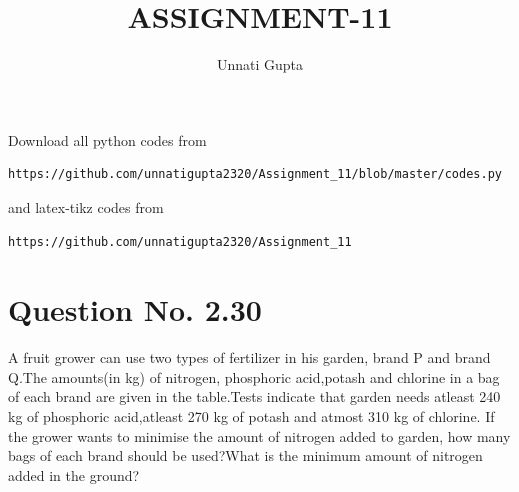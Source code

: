 \documentclass[journal,12pt,twocolumn]{IEEEtran}
\begin{document}
     \def\centbox#1{\makebox[0in]{#1}}
     \def\topbox#1{\raisebox{-\baselineskip}[0in][0in]{#1}}
     \def\midbox#1{\raisebox{-0.5\baselineskip}[0in][0in]{#1}}
\vspace{3cm}
\title{ASSIGNMENT-11}
\author{Unnati Gupta}
\maketitle
\newpage
\bigskip
\renewcommand{\thefigure}{\theenumi}
\renewcommand{\thetable}{\theenumi}
Download all python codes from 
\begin{lstlisting}
https://github.com/unnatigupta2320/Assignment_11/blob/master/codes.py
\end{lstlisting}
%
and latex-tikz codes from 
%
\begin{lstlisting}
https://github.com/unnatigupta2320/Assignment_11
\end{lstlisting}
%
\section{Question No. 2.30}
A fruit grower can use two types of fertilizer in his garden, brand P and brand Q.The amounts(in kg) of nitrogen, phosphoric acid,potash and chlorine in a bag of each brand are given in the table.Tests indicate that garden needs atleast 240 kg of phosphoric acid,atleast 270 kg of potash and atmost 310 kg of chlorine. If the grower wants to minimise the amount of nitrogen added to garden, how many bags of each brand should be used?What is the minimum amount of nitrogen added in the ground?
\begin{table}[!ht]
\centering
{}
\caption{kg per bag}
\label{tab:table1}
\end{table}
\end{document}
